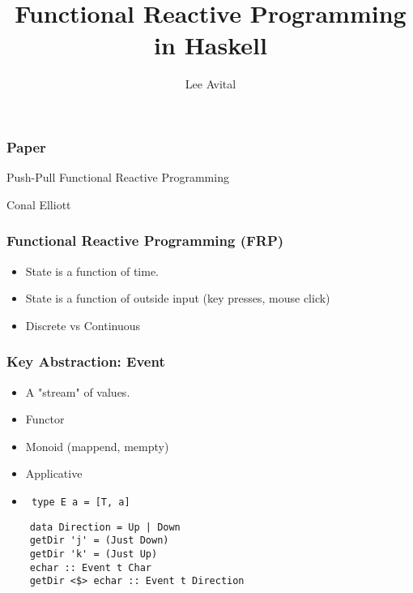 \documentclass{beamer}
\title{Functional Reactive Programming in Haskell}
\author{Lee Avital}
\begin{document}
\maketitle



\begin{frame}
  \frametitle{Paper}

  Push-Pull Functional Reactive Programming

  Conal Elliott

\end{frame}

\begin{frame}
  \frametitle{Functional Reactive Programming (FRP)}

  \begin{itemize}
    \item State is a function of time.
    \item State is a function of outside input (key presses, mouse click)
    \item Discrete vs Continuous
  \end{itemize}
\end{frame}



\begin{frame}[fragile]
  \frametitle{Key Abstraction: Event}


  \begin{itemize}
    \item A "stream" of values.
    \item Functor
    \item Monoid (mappend, mempty)
    \item Applicative
    \item \texttt{ type E a = [T, a] }
  \end{itemize}

  \begin{Verbatim}
    data Direction = Up | Down
    getDir 'j' = (Just Down)
    getDir 'k' = (Just Up)
    echar :: Event t Char
    getDir <$> echar :: Event t Direction
  \end{Verbatim}

\end{frame}
\end{document}

